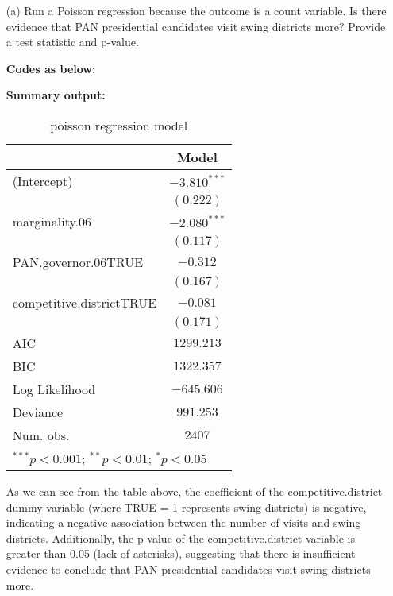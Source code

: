 \documentclass[12pt,a4paper]{article}
\begin{document}
\begin{enumerate}
	\item [(a)]
	Run a Poisson regression because the outcome is a count variable. Is there evidence that PAN presidential candidates visit swing districts more? Provide a test statistic and p-value.
	
			\noindent \textbf{Codes as below:}
	
			\noindent \textbf{Summary output:}
			
	\begin{table}[h]
		\begin{center}
			\begin{tabular}{l c}\hline & Model  \\\hline(Intercept)              & $-3.810^{***}$ \\                         & $(0.222)$      \\marginality.06           & $-2.080^{***}$ \\                         & $(0.117)$      \\PAN.governor.06TRUE      & $-0.312$       \\                         & $(0.167)$      \\competitive.districtTRUE & $-0.081$       \\                         & $(0.171)$      \\\hline AIC                      & $1299.213$     \\BIC                      & $1322.357$     \\Log Likelihood           & $-645.606$     \\Deviance                 & $991.253$      \\Num. obs.                & $2407$         \\\hline\multicolumn{2}{l}{\scriptsize{$^{***}p<0.001$; $^{**}p<0.01$; $^{*}p<0.05$}}
			\end{tabular}\caption{poisson regression model}\label{table:coefficients}
		\end{center}
	\end{table}
	
	\noindent As we can see from the table above, the coefficient of the competitive.district dummy variable (where TRUE = 1 represents swing districts) is negative, indicating a negative association between the number of visits and swing districts. Additionally, the p-value of the competitive.district variable is greater than 0.05 (lack of asterisks), suggesting that there is insufficient evidence to conclude that PAN presidential candidates visit swing districts more.
	

\end{enumerate}
\end{document}
